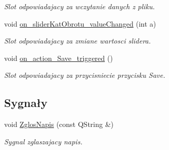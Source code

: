 \begin{DoxyCompactItemize}
\begin{DoxyCompactList}\small\item\em Slot odpowiadajacy za wczytanie danych z pliku. \end{DoxyCompactList}\item 
void \hyperlink{class_okno_glowne_a13edcaa9e3c75c793db2b147b2ffd12b}{on\+\_\+slider\+Kat\+Obrotu\+\_\+value\+Changed} (int a)
\begin{DoxyCompactList}\small\item\em Slot odpowiadajacy za zmiane wartosci slidera. \end{DoxyCompactList}\item 
void \hyperlink{class_okno_glowne_a8ed8fc49c9c3d3e187639880ce286c88}{on\+\_\+action\+\_\+\+Save\+\_\+triggered} ()
\begin{DoxyCompactList}\small\item\em Slot odpowiadajacy za przycisniecie przycisku Save. \end{DoxyCompactList}\end{DoxyCompactItemize}
\subsection*{Sygnały}
\begin{DoxyCompactItemize}
\item 
void \hyperlink{class_okno_glowne_aa602a0c5a940f0af4ab7390bfc1a4b9d}{Zglos\+Napis} (const Q\+String \&)
\begin{DoxyCompactList}\small\item\em Sygnal zglaszajacy napis. \end{DoxyCompactList}\end{DoxyCompactItemize}
